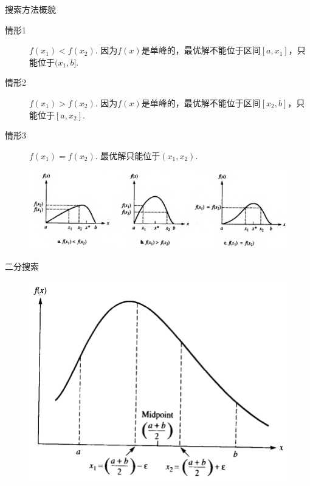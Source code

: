 \documentclass[mathserif, table]{beamer}
\begin{document}
\begin{frame}{搜索方法概貌}
  \begin{description}
  \item[情形1] $f(x_1) < f(x_2)$. 因为$f(x)$是单峰的，最优解不能位于区间$[a, x_1]$，只能位于$(x_1, b]$.
  \item[情形2] $f(x_1) > f(x_2)$. 因为$f(x)$是单峰的，最优解不能位于区间$[x_2, b]$，只能位于$[a, x_2]$.
  \item[情形3] $f(x_1) = f(x_2)$. 最优解只能位于$(x_1, x_2)$.
  \end{description}

  \begin{figure}
    \includegraphics[width=\textwidth{}]{search.png}
  \end{figure}  

\end{frame}

\begin{frame}{二分搜索}
  \begin{figure}
    \includegraphics[height=.8\textheight{}]{binary.png}
  \end{figure}    
\end{frame}
\end{document}

